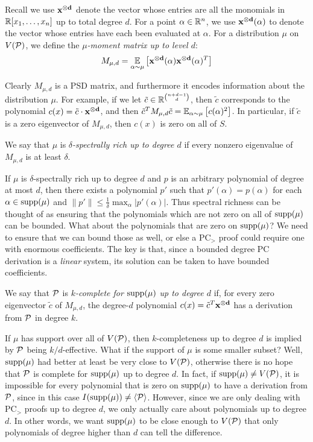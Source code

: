 \begin{definition}
Recall we use $\mathbf{x^{\otimes d}}$ denote the vector whose entries are all the monomials in $\mathbb R[x_1,\dots,x_n]$ up to total degree $d$. 
For a point $\alpha \in \mathbb R^n$, we use $\mathbf{x^{\otimes d}}(\alpha)$ to denote the vector whose entries have each been evaluated at $\alpha$.
For a distribution $\mu$ on $V(\mathcal P)$, we define the \emph{$\mu$-moment matrix up to level $d$}:
\[M_{\mu,d} = \operatorname*{\mathbb{E}}_{\alpha \sim \mu}\left[\mathbf{x^{\otimes d}}(\alpha)\mathbf{x^{\otimes d}}(\alpha)^T\right]\]
\end{definition}
Clearly $M_{\mu,d}$ is a PSD matrix, and furthermore it encodes information about the distribution $\mu$. For example, if we let $\tilde{c} \in \mathbb R^{\binom{n+d-1}{d}}$, then $\tilde{c}$ corresponds to the polynomial $c(x) = \tilde{c} \cdot \mathbf{x^{\otimes d}}$, and then $\tilde{c}^TM_{\mu,d}\tilde{c} = \operatorname*{\mathbb{E}}_{\alpha \sim \mu}\left[c(\alpha)^2\right]$.
In particular, if $\tilde{c}$ is a zero eigenvector of $M_{\mu,d}$, then $c(x)$ is zero on all of $S$.  
\begin{definition}
We say that $\mu$ is \emph{$\delta$-spectrally rich up to degree $d$} if every nonzero eigenvalue of $M_{\mu,d}$ is at least $\delta$. 
\end{definition}
If $\mu$ is $\delta$-spectrally rich up to degree $d$ and $p$ is an arbitrary polynomial of degree at most $d$, then there exists a polynomial $p'$ such that $p'(\alpha) = p(\alpha)$ for each $\alpha \in \operatorname{supp}(\mu)$ and $\|p'\| \leq \frac{1}{\delta} \max_\alpha |p'(\alpha)|$. Thus spectral richness can be thought of as ensuring that the polynomials which are not zero on all of $\operatorname{supp}(\mu)$ can be bounded. What about the polynomials that are zero on $\operatorname{supp}(\mu)$? We need to ensure that we can bound those as well, or else a PC$_>$ proof could require one with enormous coefficients. The key is that, since a bounded degree PC derivation is a \emph{linear} system, its solution can be taken to have bounded coefficients.
\begin{definition}
We say that $\mathcal P$ is \emph{$k$-complete for $\operatorname{supp}(\mu)$ up to degree $d$} if, for every zero eigenvector $\tilde{c}$ of $M_{\mu,d}$, the degree-$d$ polynomial $c(x) = \tilde{c}^T\mathbf{x^{\otimes d}}$ has a derivation from $\mathcal P$ in degree $k$.
\end{definition}
If $\mu$ has support over all of $V(\mathcal P)$, then $k$-completeness up to degree $d$ is implied by $\mathcal P$ being $k/d$-effective. 
What if the support of $\mu$ is some smaller subset? Well, $\operatorname{supp}(\mu)$ had better at least be very close to $V(\mathcal P)$, otherwise there is no hope that $\mathcal P$ is complete for $\operatorname{supp}(\mu)$ up to degree $d$. In fact, if $\operatorname{supp}(\mu) \neq V(\mathcal P)$, it is impossible for every polynomial that is zero on $\operatorname{supp}(\mu)$ to have a derivation from $\mathcal P$, since in this case $I(\operatorname{supp}(\mu)) \neq \langle \mathcal P \rangle$. However, since we are only dealing with PC$_>$ proofs up to degree $d$, we only actually care about polynomials up to degree $d$. In other words, we want $\operatorname{supp}(\mu)$ to be close enough to $V(\mathcal P)$ that only polynomials of degree higher than $d$ can tell the difference.
